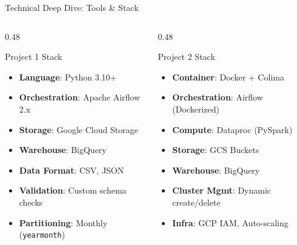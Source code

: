 \documentclass{beamer}
\begin{document}
\begin{frame}[shrink=8]{Technical Deep Dive: Tools \& Stack}
  \begin{columns}[T]
    \begin{column}{0.48\textwidth}
      \begin{block}{\faLayerGroup\quad Project 1 Stack}
        \begin{itemize}
          \item \textbf{Language}: Python 3.10+
          \item \textbf{Orchestration}: Apache Airflow 2.x
          \item \textbf{Storage}: Google Cloud Storage
          \item \textbf{Warehouse}: BigQuery
          \item \textbf{Data Format}: CSV, JSON
          \item \textbf{Validation}: Custom schema checks
          \item \textbf{Partitioning}: Monthly (\texttt{yearmonth})
        \end{itemize}
      \end{block}
    \end{column}
    \begin{column}{0.48\textwidth}
      \begin{alertblock}{\faLayerGroup\quad Project 2 Stack}
        \begin{itemize}
          \item \textbf{Container}: Docker + Colima
          \item \textbf{Orchestration}: Airflow (Dockerized)
          \item \textbf{Compute}: Dataproc (PySpark)
          \item \textbf{Storage}: GCS Buckets
          \item \textbf{Warehouse}: BigQuery
          \item \textbf{Cluster Mgmt}: Dynamic create/delete
          \item \textbf{Infra}: GCP IAM, Auto-scaling
        \end{itemize}
      \end{alertblock}
    \end{column}
  \end{columns}
  \vspace{0.2cm}
  \begin{center}
  \end{center}
\end{frame}
\end{document}

